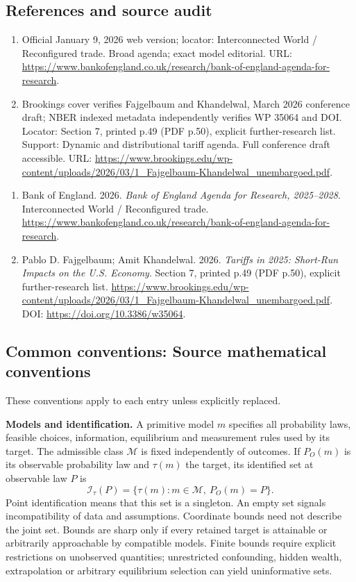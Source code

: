 \documentclass[11pt,a4paper]{article}
\begin{document}
\subsection*{References and source audit}
\begin{enumerate}
\item Official January 9, 2026 web version; locator: Interconnected World / Reconfigured trade. Broad agenda; exact model editorial. URL: \url{https://www.bankofengland.co.uk/research/bank-of-england-agenda-for-research}.
\item Brookings cover verifies Fajgelbaum and Khandelwal, March 2026 conference draft; NBER indexed metadata independently verifies WP 35064 and DOI. Locator: Section 7, printed p.49 (PDF p.50), explicit further-research list. Support: Dynamic and distributional tariff agenda. Full conference draft accessible. URL: \url{https://www.brookings.edu/wp-content/uploads/2026/03/1_Fajgelbaum-Khandelwal_unembargoed.pdf}.
\end{enumerate}
\begin{enumerate}\raggedright
\item\hypertarget{definitions:source:30007625:1}{} Bank of England. 2026. \emph{Bank of England Agenda for Research, 2025–2028}. Interconnected World / Reconfigured trade.
\url{https://www.bankofengland.co.uk/research/bank-of-england-agenda-for-research}.
\item\hypertarget{definitions:source:30007625:2}{} Pablo D. Fajgelbaum; Amit Khandelwal. 2026. \emph{Tariffs in 2025: Short-Run Impacts on the U.S. Economy}. Section 7, printed p.49 (PDF p.50), explicit further-research list.
\url{https://www.brookings.edu/wp-content/uploads/2026/03/1_Fajgelbaum-Khandelwal_unembargoed.pdf}.
DOI: \url{https://doi.org/10.3386/w35064}.
\end{enumerate}

\subsection*{Common conventions: Source mathematical conventions}

These conventions apply to each entry unless explicitly replaced.

\textbf{Models and identification.} A primitive model \(m\) specifies all probability laws, feasible choices, information, equilibrium and measurement rules used by its target. The admissible class \(\mathcal M\) is fixed independently of outcomes. If \(P_O(m)\) is its observable probability law and \(\tau(m)\) the target, its identified set at observable law \(P\) is
\[
 \mathcal I_\tau(P)=\{\tau(m):m\in\mathcal M,\ P_O(m)=P\}.
\]
Point identification means that this set is a singleton. An empty set signals incompatibility of data and assumptions. Coordinate bounds need not describe the joint set. Bounds are sharp only if every retained target is attainable or arbitrarily approachable by compatible models. Finite bounds require explicit restrictions on unobserved quantities; unrestricted confounding, hidden wealth, extrapolation or arbitrary equilibrium selection can yield uninformative sets.
\end{document}
